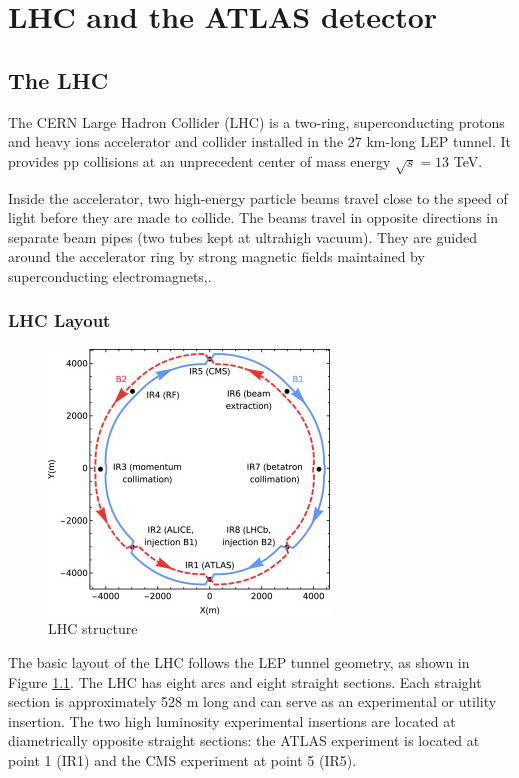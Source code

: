 \documentclass[a4paper, oneside, 11pt, openright]{book}
\begin{document}
\tableofcontents

	\chapter{LHC and the ATLAS detector}
		\section{The LHC}
			The CERN Large Hadron Collider (LHC) \cite{LHC design} is a two-ring, superconducting protons and heavy ions accelerator and collider installed in the 27 km-long LEP tunnel. It provides pp collisions at an unprecedent center of mass energy $\sqrt{s} = 13$ TeV.
			
			Inside the accelerator, two high-energy particle beams travel close to the speed of light before they are made to collide. The beams travel in opposite directions in separate beam pipes (two tubes kept at ultrahigh vacuum). They are guided around the accelerator ring by strong magnetic fields maintained by superconducting electromagnets\cite{LHC introduction},\cite{LHC site}.
				\subsection{LHC Layout}
					\begin{figure}[H]
						\centering
						\includegraphics[width=0.3\textheight]{tesi_images/LHC_structure.jpg}
						\caption{LHC structure}
						\label{fig:LHC structure}
					\end{figure}
					The basic layout of the LHC follows the LEP tunnel geometry, as shown in Figure \ref{fig:LHC structure}. The LHC has eight arcs and eight straight sections. Each straight section is approximately 528 m long and can serve as an experimental or utility insertion. The two high luminosity experimental insertions are located at diametrically opposite straight sections: the ATLAS experiment is located at point 1 (IR1) and the CMS experiment at point 5 (IR5).
					
\end{document}
